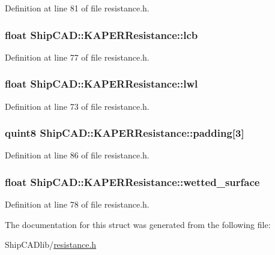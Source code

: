 Definition at line 81 of file resistance.\-h.

\hypertarget{structShipCAD_1_1KAPERResistance_a3b351285dc50665147ce987e0744b314}{
\subsubsection[{lcb}]{\setlength{\rightskip}{0pt plus 5cm}float Ship\-C\-A\-D\-::\-K\-A\-P\-E\-R\-Resistance\-::lcb}}\label{structShipCAD_1_1KAPERResistance_a3b351285dc50665147ce987e0744b314}


Definition at line 77 of file resistance.\-h.

\hypertarget{structShipCAD_1_1KAPERResistance_a1c2aa0aa33bf7770cd531f1d1ea8b809}{
\subsubsection[{lwl}]{\setlength{\rightskip}{0pt plus 5cm}float Ship\-C\-A\-D\-::\-K\-A\-P\-E\-R\-Resistance\-::lwl}}\label{structShipCAD_1_1KAPERResistance_a1c2aa0aa33bf7770cd531f1d1ea8b809}


Definition at line 73 of file resistance.\-h.

\hypertarget{structShipCAD_1_1KAPERResistance_a6ff5b219f299159cf66bc450d2ac2a73}{
\subsubsection[{padding}]{\setlength{\rightskip}{0pt plus 5cm}quint8 Ship\-C\-A\-D\-::\-K\-A\-P\-E\-R\-Resistance\-::padding\mbox{[}3\mbox{]}}}\label{structShipCAD_1_1KAPERResistance_a6ff5b219f299159cf66bc450d2ac2a73}


Definition at line 86 of file resistance.\-h.

\hypertarget{structShipCAD_1_1KAPERResistance_a912090d77ad755a5b1506372c24540bc}{
\subsubsection[{wetted\-\_\-surface}]{\setlength{\rightskip}{0pt plus 5cm}float Ship\-C\-A\-D\-::\-K\-A\-P\-E\-R\-Resistance\-::wetted\-\_\-surface}}\label{structShipCAD_1_1KAPERResistance_a912090d77ad755a5b1506372c24540bc}


Definition at line 78 of file resistance.\-h.



The documentation for this struct was generated from the following file\-:\begin{DoxyCompactItemize}
\item 
Ship\-C\-A\-Dlib/\hyperlink{resistance_8h}{resistance.\-h}\end{DoxyCompactItemize}
